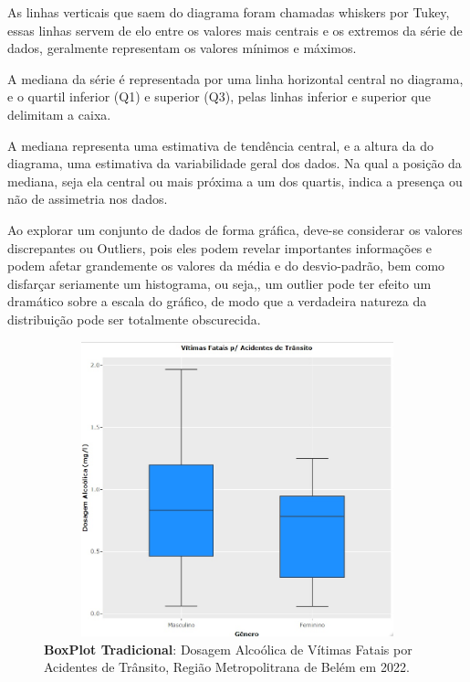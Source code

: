 \newpage
\inic As linhas verticais que saem do diagrama foram chamadas whiskers
por Tukey, essas linhas servem de elo entre os valores mais
centrais e os extremos da série de dados, geralmente representam
os valores mínimos e máximos.\vskip0.3cm 


A mediana da série é representada
por uma linha horizontal central no diagrama, e o quartil inferior
(Q1) e superior (Q3), pelas linhas inferior e superior que
delimitam a caixa.\vskip0.3cm  

A mediana representa uma estimativa de tendência central, e a altura da do diagrama, uma estimativa da variabilidade geral dos
dados. Na qual a posição da mediana, seja ela central ou mais
próxima a um dos quartis, indica a presença ou não de assimetria
nos dados.\vskip0.3cm


\inic Ao explorar um conjunto de dados de forma gráfica, deve-se considerar os valores discrepantes ou Outliers, pois eles podem revelar importantes informações e podem afetar grandemente os valores da média e do desvio-padrão, bem como disfarçar seriamente um histograma, ou seja,, um outlier pode ter efeito um dramático sobre a escala do gráfico, de modo que a verdadeira natureza da distribuição pode ser totalmente  obscurecida.



\newpage

\vspace{-3cm}
\begin{figure}[H]
    \centering
\includegraphics[scale=0.26,height=242pt,width=12cm]{figures/boxplot_dosagem.jpeg}
    \caption{\textbf{BoxPlot Tradicional}: Dosagem Alcoólica de Vítimas Fatais por Acidentes de Trânsito, Região Metropolitrana de Belém em 2022.}
    \label{fig:my_label25}
\end{figure}



